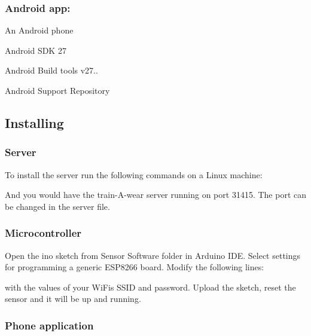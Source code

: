 \subsubsection*{Android app\+:}


\begin{DoxyItemize}
\item An Android phone 
\begin{DoxyItemize}
\item Android S\+DK 27  
\item Android Build tools v27..  
\item Android Support Repository  
\end{DoxyItemize}
\end{DoxyItemize}

\subsection*{Installing}

\subsubsection*{Server}

To install the server run the following commands on a Linux machine\+: 
\begin{DoxyCode}{0}
\end{DoxyCode}
 And you would have the train-\/\+A-\/wear server running on port 31415. The port can be changed in the server file.

\subsubsection*{Microcontroller}

Open the ino sketch from Sensor Software folder in Arduino I\+DE. Select settings for programming a generic E\+S\+P8266 board. Modify the following lines\+: 
\begin{DoxyCode}{0}
\end{DoxyCode}
 with the values of your Wi\+Fi\textquotesingle{}s S\+S\+ID and password. Upload the sketch, reset the sensor and it will be up and running.

\subsubsection*{Phone application}

